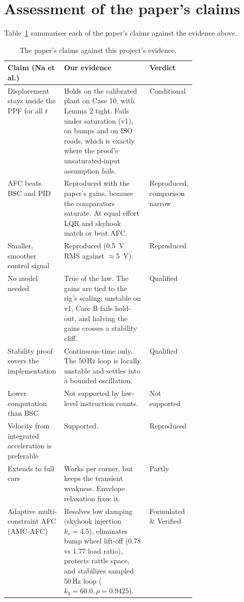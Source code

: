 \documentclass[10pt,a4paper]{article}
\begin{document}
\section{Assessment of the paper's claims}
Table~\ref{tab:claims} summarises each of the paper's claims against the evidence above.
\begin{table}[!htbp]
\centering\small
\caption{The paper's claims against this project's evidence.}\label{tab:claims}
\begin{tabularx}{\linewidth}{@{}>{\raggedright\arraybackslash}p{0.30\linewidth}X>{\raggedright\arraybackslash}p{0.13\linewidth}@{}}
\toprule
Claim (Na et al.) & Our evidence & Verdict\\
\midrule
Displacement stays inside the PPF for all \(t\) & Holds on the calibrated plant on Case 10, with Lemma 2 tight. Fails under saturation (v1), on bumps and on ISO roads, which is exactly where the proof's unsaturated-input assumption fails. & Conditional\\
AFC beats BSC and PID & Reproduced with the paper's gains, because the comparators saturate. At equal effort LQR and skyhook match or beat AFC. & Reproduced, comparison narrow\\
Smaller, smoother control signal & Reproduced (\SI{0.5}{V} RMS against \(\approx\)\SI{5}{V}). & Reproduced\\
No model needed & True of the law. The gains are tied to the rig's scaling: unstable on v1, Case B fails hold-out, and halving the gains crosses a stability cliff. & Qualified\\
Stability proof covers the implementation & Continuous-time only. The 50\,Hz loop is locally unstable and settles into a bounded oscillation. & Qualified\\
Lower computation than BSC & Not supported by law-level instruction counts. & Not supported\\
Velocity from integrated acceleration is preferable & Supported. & Reproduced\\
Extends to full cars & Works per corner, but keeps the transient weakness. Envelope relaxation fixes it. & Partly\\
Adaptive multi-constraint AFC (AMC-AFC) & Resolves low damping (skyhook injection $k_v=4.5$), eliminates bump wheel lift-off (0.78 vs 1.77 load ratio), protects rattle space, and stabilizes sampled 50\,Hz loop ($k_3=60.0, \rho=0.9425$). & Formulated \& Verified\\
\bottomrule
\end{tabularx}
\end{table}
\end{document}
